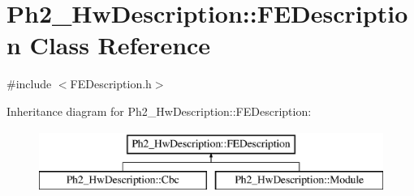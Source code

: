 \hypertarget{class_ph2___hw_description_1_1_f_e_description}{\section{Ph2\-\_\-\-Hw\-Description\-:\-:F\-E\-Description Class Reference}
\label{class_ph2___hw_description_1_1_f_e_description}
}


{\ttfamily \#include $<$F\-E\-Description.\-h$>$}

Inheritance diagram for Ph2\-\_\-\-Hw\-Description\-:\-:F\-E\-Description\-:\begin{figure}[H]
\begin{center}
\leavevmode
\includegraphics[height=2.000000cm]{class_ph2___hw_description_1_1_f_e_description}
\end{center}
\end{figure}
